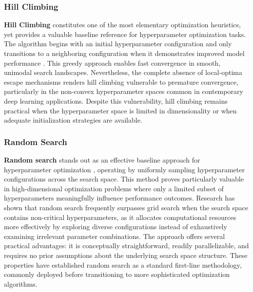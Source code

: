 \documentclass[12pt]{article}
\begin{document}
\subsubsection{Hill Climbing}
\textbf{Hill Climbing} constitutes one of the most elementary optimization heuristics, yet provides a valuable baseline reference for hyperparameter optimization tasks. The algorithm begins with an initial hyperparameter configuration and only transitions to a neighboring configuration when it demonstrates improved model performance \cite{hcopt}. This greedy approach enables fast convergence in smooth, unimodal search landscapes. Nevertheless, the complete absence of local-optima escape mechanisms renders hill climbing vulnerable to premature convergence, particularly in the non-convex hyperparameter spaces common in contemporary deep learning applications. Despite this vulnerability, hill climbing remains practical when the hyperparameter space is limited in dimensionality or when adequate initialization strategies are available.
\subsubsection{Random Search}
\textbf{Random search} stands out as an effective baseline approach for hyperparameter optimization \cite{bergstra2012random}, operating by uniformly sampling hyperparameter configurations across the search space. This method proves particularly valuable in high-dimensional optimization problems where only a limited subset of hyperparameters meaningfully influence performance outcomes. Research has shown that random search frequently surpasses grid search when the search space contains non-critical hyperparameters, as it allocates computational resources more effectively by exploring diverse configurations instead of exhaustively examining irrelevant parameter combinations. The approach offers several practical advantages: it is conceptually straightforward, readily parallelizable, and requires no prior assumptions about the underlying search space structure. These properties have established random search as a standard first-line methodology, commonly deployed before transitioning to more sophisticated optimization algorithms.
\end{document}
